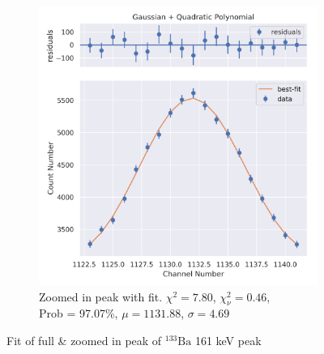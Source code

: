 \documentclass[11pt,a4paper]{article}
\newcommand{\element}[2]{$^{#2}\textrm{#1}$}
\begin{document}
\begin{figure}[H]
\begin{subfigure}{.5\linewidth}
    \includegraphics[width=\linewidth]{./Images/Barium133/Quad/Quad_2_Zoom.png}
    \caption{Zoomed in peak with fit. $\chi^2 = 7.80$, $\chi^2_\nu = 0.46$, \\ Prob = 97.07\%, $\mu = 1131.88$, $\sigma = 4.69$}
  \end{subfigure}
  \caption{Fit of full \& zoomed in peak of \element{Ba}{133} 161 keV peak}
\end{figure}
\end{document}

